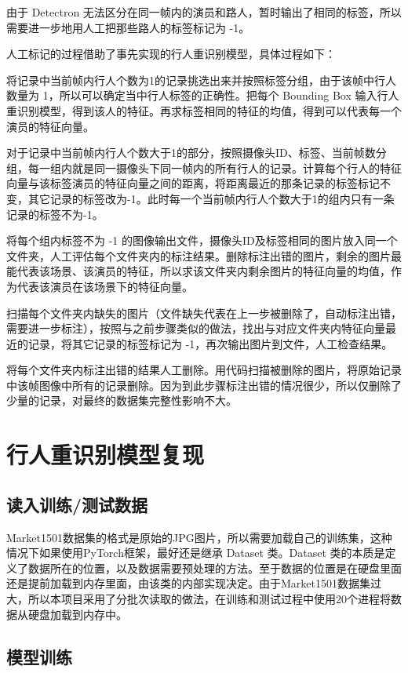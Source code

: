 由于 Detectron 无法区分在同一帧内的演员和路人，暂时输出了相同的标签，所以需要进一步地用人工把那些路人的标签标记为 -1。

人工标记的过程借助了事先实现的行人重识别模型，具体过程如下：

将记录中当前帧内行人个数为1的记录挑选出来并按照标签分组，由于该帧中行人数量为 1，所以可以确定当中行人标签的正确性。把每个 Bounding Box 输入行人重识别模型，得到该人的特征。再求标签相同的特征的均值，得到可以代表每一个演员的特征向量。

对于记录中当前帧内行人个数大于1的部分，按照摄像头ID、标签、当前帧数分组，每一组内就是同一摄像头下同一帧内的所有行人的记录。计算每个行人的特征向量与该标签演员的特征向量之间的距离，将距离最近的那条记录的标签标记不变，其它记录的标签改为-1。此时每一个当前帧内行人个数大于1的组内只有一条记录的标签不为-1。

将每个组内标签不为 -1 的图像输出文件，摄像头ID及标签相同的图片放入同一个文件夹，人工评估每个文件夹内的标注结果。删除标注出错的图片，剩余的图片最能代表该场景、该演员的特征，所以求该文件夹内剩余图片的特征向量的均值，作为代表该演员在该场景下的特征向量。

扫描每个文件夹内缺失的图片（文件缺失代表在上一步被删除了，自动标注出错，需要进一步标注），按照与之前步骤类似的做法，找出与对应文件夹内特征向量最近的记录，将其它记录的标签标记为 -1，再次输出图片到文件，人工检查结果。

将每个文件夹内标注出错的结果人工删除。用代码扫描被删除的图片，将原始记录中该帧图像中所有的记录删除。因为到此步骤标注出错的情况很少，所以仅删除了少量的记录，对最终的数据集完整性影响不大。

\section{行人重识别模型复现}

\subsection{读入训练/测试数据}

Market1501数据集的格式是原始的JPG图片，所以需要加载自己的训练集，这种情况下如果使用PyTorch框架，最好还是继承 Dataset 类。Dataset 类的本质是定义了数据所在的位置，以及数据需要预处理的方法。至于数据的位置是在硬盘里面还是提前加载到内存里面，由该类的内部实现决定。由于Market1501数据集过大，所以本项目采用了分批次读取的做法，在训练和测试过程中使用20个进程将数据从硬盘加载到内存中。

\subsection{模型训练}

